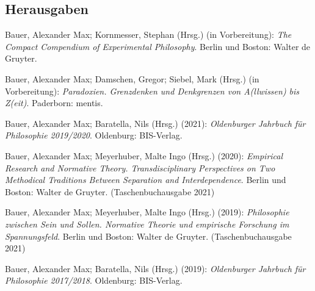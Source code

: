 \documentclass[a4paper,10pt]{article}
\newenvironment{literature}{%
   \parskip6pt\parindent0pt\raggedright
   \def\lititem{\hangindent=1cm\hangafter1}}{%
   \par\ignorespaces}
\begin{document}
\subsection*{Herausgaben}
\begin{literature}
\lititem Bauer, Alexander Max; Kornmesser, Stephan (Hrsg.) (in Vorbereitung): \textit{The Compact Compendium of Experimental Philosophy}. Berlin und Boston: Walter de Gruyter.

\lititem Bauer, Alexander Max; Damschen, Gregor; Siebel, Mark (Hrsg.) (in Vorbereitung): \textit{Paradoxien. Grenzdenken und Denkgrenzen von A(llwissen) bis Z(eit)}. Paderborn: mentis.

\lititem Bauer, Alexander Max; Baratella, Nils (Hrsg.) (2021): \textit{Oldenburger Jahrbuch für Philosophie 2019/2020}. Oldenburg: BIS-Verlag.

\lititem Bauer, Alexander Max; Meyerhuber, Malte Ingo (Hrsg.) (2020): \textit{Empirical Research and Normative Theory. Transdisciplinary Perspectives on Two Methodical Traditions Between Separation and Interdependence}. Berlin und Boston: Walter de Gruyter. (Taschenbuchausgabe 2021)

\lititem Bauer, Alexander Max; Meyerhuber, Malte Ingo (Hrsg.) (2019): \textit{Philosophie zwischen Sein und Sollen. Normative Theorie und empirische Forschung im Spannungsfeld}. Berlin und Boston: Walter de Gruyter. (Taschenbuchausgabe 2021)

\lititem Bauer, Alexander Max; Baratella, Nils (Hrsg.) (2019): \textit{Oldenburger Jahrbuch für Philosophie 2017/2018}. Oldenburg: BIS-Verlag.
\end{literature}
\end{document}
